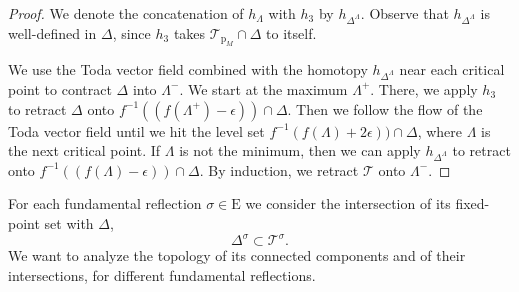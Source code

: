 \documentclass[reqno]{amsart}
\newcommand{\p}{\mathrm{p}}
\newcommand{\cT}{\mathcal{T}}
\newcommand{\E}{\mathrm{E}}
\begin{document}
\begin{proof}
We denote the concatenation of $h_\Lambda$ with $h_3$ by $h_{\Delta^\Lambda}$. Observe that $h_{\Delta^\Lambda}$ is well-defined in $\Delta$, since $h_3$ takes $\cT_{\p_M}\cap \Delta$ to itself.



We use  the Toda vector field combined with the homotopy $h_{\Delta^\Lambda}$
near each critical point to contract $\Delta$ into $\Lambda^{-}$.
We start at the maximum $\Lambda^+$.
There, we apply $h_3$ to retract $\Delta$ onto $f^{-1}((f(\Lambda^+)-\epsilon))\cap \Delta$. Then we follow the flow of the Toda vector field until we hit the level set
$f^{-1}(f(\Lambda)+2\epsilon))\cap \Delta$, where $\Lambda$ is the next critical point. If $\Lambda$ is not the minimum, then  we can apply  $h_{\Delta^\Lambda}$ to retract onto $f^{-1}((f(\Lambda)-\epsilon))\cap \Delta$. By induction, we retract $\cT$ onto $\Lambda^{-}$.
\end{proof}



For each fundamental reflection $\sigma\in \E$  we consider the intersection of its  fixed-point set with $\Delta$,
\[\Delta^\sigma\subset \cT^\sigma.\]
We want to analyze the topology of its connected components and of their intersections, for different fundamental reflections.
\end{document}
